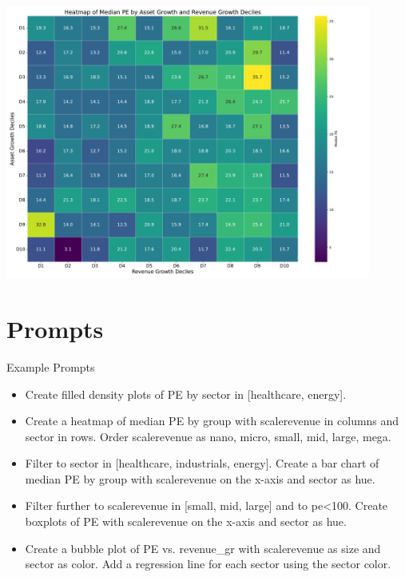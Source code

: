 \documentclass[10pt]{beamer}
\begin{document}
  \begin{frame}[plain] 
    \begin{center}
    \includegraphics[width=0.9\textwidth]{financial_images/heatmap_pe_by_growth_deciles_viridis.pdf}
    \end{center}
  \end{frame}
  \section{Prompts}

  

\begin{frame}{Example Prompts}
  \begin{itemize}
    \item Create filled density plots of PE by sector in [healthcare, energy].
    \item Create a heatmap of median PE by group with scalerevenue in columns and sector in rows.  Order scalerevenue as nano, micro, small, mid, large, mega.
  \item Filter to sector in [healthcare, industrials, energy].  Create a bar chart of median PE by group with scalerevenue on the x-axis and sector as hue.  
  \item Filter further to scalerevenue in [small, mid, large] and to pe<100.  Create boxplots of PE with scalerevenue on the x-axis and sector as hue.  
  \item Create a bubble plot of PE vs. revenue\_gr with scalerevenue as size and sector as color.  Add a regression line for each sector using the sector color.  
  
  \end{itemize}
\end{frame}
\end{document}

